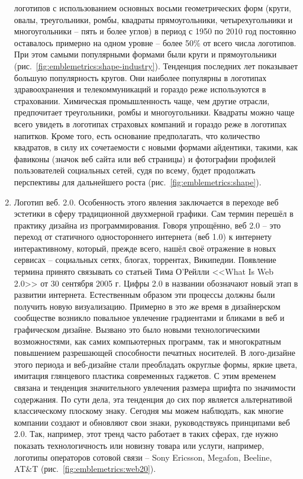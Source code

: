 \begin{enumerate}
  логотипов с использованием основных восьми геометрических форм (круги, овалы, треугольники, ромбы,
  квадраты прямоугольники, четырехугольники и многоугольники -- пять и более  углов)  в период с
  1950 по 2010 год постоянно оставалось примерно на одном уровне -- более 50\% от всего числа
  логотипов. При этом самыми популярными формами были круги и прямоугольники
  (рис.~\ref{fig:emblemetrics:shape-industry}). Тенденция последних лет показывает большую
  популярность кругов. Они наиболее популярны в логотипах здравоохранения и телекоммуникаций и
  гораздо реже используются в страховании. Химическая промышленность чаще, чем другие отрасли,
  предпочитает треугольники, ромбы и многоугольники. Квадраты можно чаще всего увидеть в логотипах
  страховых компаний и гораздо реже в логотипах напитков. Кроме того, есть основание предполагать,
  что количество квадратов, в силу их сочетаемости  с новыми формами айдентики, такими, как фавиконы
  (значок веб сайта или веб страницы) и фотографии профилей пользователей социальных сетей, судя по
  всему, будет продолжать  перспективы  для дальнейшего роста (рис.~\ref{fig:emblemetrics:shape}).
\item Логотип веб. 2.0. Особенность этого явления  заключается в переходе веб эстетики в сферу
  традиционной двухмерной графики. Сам термин перешёл в практику дизайна из
  программирования. Говоря упрощённо, веб 2.0 -- это переход от статичного одностороннего интернета
  (веб 1.0) к интернету интерактивному, который, прежде всего, нашёл своё отражение в новых сервисах
  -- социальных сетях, блогах, торрентах, Википедии. Появление термина принято связывать со статьей
  Тима О'Рейлли <<What Is Web 2.0>> от 30 сентября 2005 г. Цифры 2.0 в названии обозначают новый
  этап в развитии интернета. Естественным образом эти процессы должны были получить новую
  визуализацию. Примерно в это же время в дизайнерском сообществе возникло повальное увлечение
  градиентами и бликами в веб и графическом дизайне. Вызвано это было новыми технологическими
  возможностями, как самих компьютерных программ, так и многократным повышением разрешающей
  способности печатных носителей. В лого-дизайне этого периода и веб-дизайне стали преобладать
  округлые формы, яркие цвета, имитация глянцевого пластика современных гаджетов. С этим временем
  связана и тенденция значительного увлечения размера шрифта по значимости содержания. По сути дела,
  эта тенденция до сих пор является альтернативой классическому плоскому знаку. Сегодня мы можем
  наблюдать, как многие компании создают и обновляют свои знаки, руководствуясь принципами веб
  2.0. Так, например, этот тренд часто работает в таких сферах, где нужно показать технологичность
  или новизну товара или услуги, например, логотипы операторов сотовой связи -- Sony Ericsson,
  Megafon, Beeline, AT\&T (рис.~\ref{fig:emblemetrics:web20}).
\end{enumerate}

